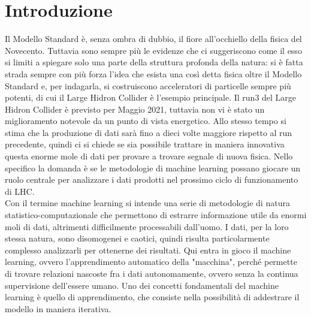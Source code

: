 %
\section{Introduzione}\label{sec:introduzione}
%
Il Modello Standard è, senza ombra di dubbio, il fiore all'occhiello della fisica del Novecento. Tuttavia sono sempre più le evidenze che ci suggeriscono come il esso si limiti a spiegare solo una parte della struttura profonda della natura: si è fatta strada sempre con più forza l'idea che esista una così detta fisica oltre il Modello Standard e, per indagarla, si costruiscono acceleratori di particelle sempre più potenti, di cui il Large Hidron Collider è l'esempio principale. 
Il run3 del Large Hidron Collider è previsto per Maggio 2021, tuttavia non vi è stato un miglioramento notevole da un punto di vista energetico. Allo stesso tempo si stima che la produzione di dati sarà fino a dieci volte maggiore rispetto al run precedente, quindi ci si chiede se sia possibile trattare in maniera innovativa questa enorme mole di dati per provare a trovare segnale di nuova fisica. Nello specifico la domanda è se le metodologie di machine learning possano giocare un ruolo centrale per analizzare i dati prodotti nel prossimo ciclo di funzionamento di LHC.\\
Con il termine machine learning si intende una serie di metodologie di natura statistico-computazionale che permettono di estrarre informazione utile da enormi moli di dati, altrimenti difficilmente processabili dall'uomo.
I dati, per la loro stessa natura, sono disomogenei e caotici, quindi risulta particolarmente complesso analizzarli per ottenerne dei risultati. Qui entra in gioco il machine learning, ovvero l'apprendimento automatico della "macchina", perché permette di trovare relazioni nascoste fra i dati autonomamente, ovvero senza la continua supervisione dell'essere umano. Uno dei concetti fondamentali del machine learning è quello di apprendimento, che consiste nella possibilità di addestrare il modello in maniera iterativa.

%
